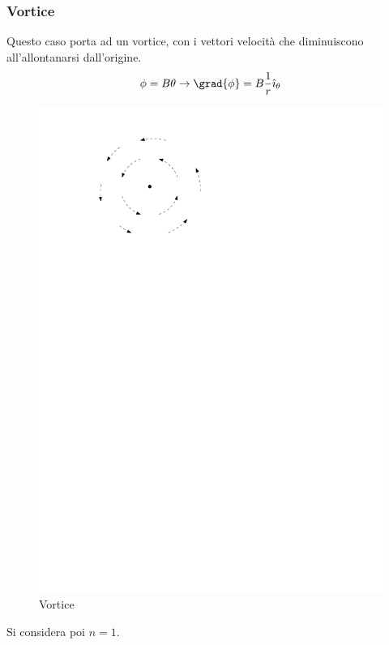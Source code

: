 \subsubsection{Vortice}
Questo caso porta ad un vortice, con i vettori velocità che diminuiscono all'allontanarsi dall'origine.
%
	\begin{equation*}
		\phi = B \theta \rightarrow \grad{\phi} = B \frac{1}{r} \hat{\imath}_\theta
	\end{equation*}
%
	\begin{figure}[ht]
		\includegraphics[scale=0.7]{./7.3 Flusso irrotazionale/7.3-4}
		\centering
		\caption{Vortice}
	\end{figure}
%

Si considera poi $n = 1$.


